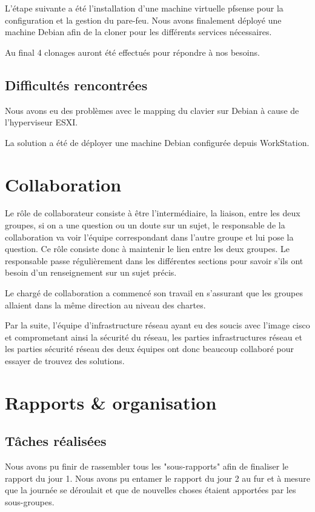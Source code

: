 \documentclass{article}
\begin{document}
       
       L'étape suivante a été l'installation d'une machine virtuelle pfsense pour la configuration et la gestion du pare-feu.
       Nous avons finalement déployé une machine Debian afin de la cloner pour les différents services nécessaires.
       
       Au final 4 clonages auront été effectués pour répondre à nos besoins. 
       
    \subsection{Difficultés rencontrées}
    
    Nous avons eu des problèmes avec le mapping du clavier sur Debian à cause de l'hyperviseur ESXI.
    
    
    La solution a été de déployer une machine Debian configurée depuis WorkStation.
\section{Collaboration}  

Le rôle de collaborateur consiste à être l’intermédiaire, la liaison, entre les deux groupes, si on a une question ou un doute sur un sujet, le responsable de la collaboration va voir l’équipe correspondant dans l’autre groupe et lui pose la question. Ce rôle consiste donc à maintenir le lien entre les deux groupes. Le responsable passe régulièrement dans les différentes sections pour savoir s'ils ont besoin d'un renseignement sur un sujet précis.

Le chargé de collaboration a commencé son travail en s'assurant que les groupes allaient dans la même direction au niveau des chartes.

Par la suite, l'équipe d'infrastructure réseau ayant eu des soucis avec l'image cisco et comprometant ainsi la sécurité du réseau, les parties infrastructures réseau et les parties sécurité réseau des deux équipes ont donc beaucoup collaboré pour essayer de trouvez des solutions.

\section{Rapports \& organisation}

    \subsection{Tâches réalisées} 
    Nous avons pu finir de rassembler tous les "sous-rapports" afin de finaliser le rapport du jour 1. 
    Nous avons pu entamer le rapport du jour 2 au fur et à mesure que la journée se déroulait et que de nouvelles choses étaient apportées par les sous-groupes.
    
\end{document}
